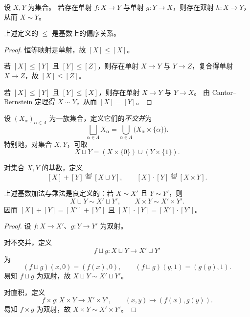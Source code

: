 \documentclass[lang=cn,a4paper,newtx]{elegantbook}
\begin{document}
\begin{theorem}
  设 $X,Y$ 为集合。
  若存在单射 $f:X\to Y$ 与单射 $g:Y\to X$，则存在双射 $h:X\to Y$，从而 $X\sim Y$。
\end{theorem}

\begin{proposition}
  上述定义的 $\le$ 是基数上的偏序关系。
\end{proposition}

\begin{proof}
  恒等映射是单射，故 $[X]\le [X]$。

  若 $[X]\le [Y]$ 且 $[Y]\le [Z]$，则存在单射 $X\to Y$ 与 $Y\to Z$，复合得单射 $X\to Z$，故 $[X]\le [Z]$。

  若 $[X]\le [Y]$ 且 $[Y]\le [X]$，则存在单射 $X\to Y$ 与 $Y\to X$。
  由 Cantor--Bernstein 定理得 $X\sim Y$，从而 $[X]=[Y]$。
\end{proof}
  \begin{definition}[不交并]
  设 $(X_{\alpha})_{\alpha\in\Lambda}$ 为一族集合，定义它们的\emph{不交并}为
  \[
    \bigsqcup_{\alpha\in\Lambda} X_{\alpha}
    =\bigcup_{\alpha\in\Lambda}\bigl(X_{\alpha}\times\{\alpha\}\bigr).
  \]
  特别地，对集合 $X,Y$，可取
  \[
    X\sqcup Y=(X\times\{0\})\cup (Y\times\{1\}).
  \]
\end{definition}

\begin{definition}[基数的加法与乘法]
  对集合 $X,Y$ 的基数，定义
  \[
    [X]+[Y]\stackrel{\mathrm{def}}{=}[X\sqcup Y],\qquad
    [X]\cdot [Y]\stackrel{\mathrm{def}}{=}[X\times Y].
  \]
\end{definition}

\begin{proposition}
  上述基数加法与乘法是良定义的：若 $X\sim X'$ 且 $Y\sim Y'$，则
  \[
    X\sqcup Y\sim X'\sqcup Y',\qquad X\times Y\sim X'\times Y'.
  \]
  因而 $[X]+[Y]=[X']+[Y']$ 且 $[X]\cdot [Y]=[X']\cdot [Y']$。
\end{proposition}

\begin{proof}
  设 $f:X\to X'$、$g:Y\to Y'$ 为双射。

  对不交并，定义
  \[
    f\sqcup g:X\sqcup Y\to X'\sqcup Y'
  \]
  为
  \[
    (f\sqcup g)(x,0)=(f(x),0),\qquad (f\sqcup g)(y,1)=(g(y),1).
  \]
  易知 $f\sqcup g$ 为双射，故 $X\sqcup Y\sim X'\sqcup Y'$。

  对直积，定义
  \[
    f\times g:X\times Y\to X'\times Y',\qquad (x,y)\mapsto (f(x),g(y)).
  \]
  易知 $f\times g$ 为双射，故 $X\times Y\sim X'\times Y'$。
\end{proof}
\end{document}
